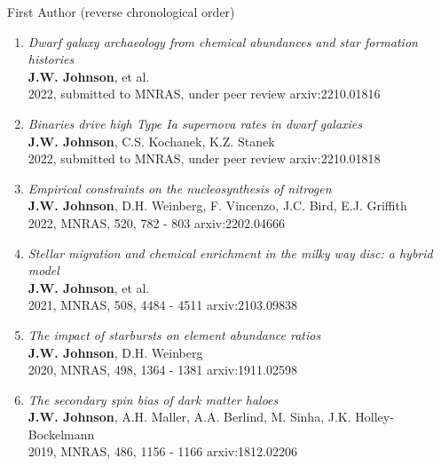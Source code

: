 \documentclass[cv.tex]{subfiles}
\begin{document}
%
\noindent
{\color{themecolor} \large First Author}
(reverse chronological order)
\par\noindent
\begin{enumerate}

	\vspace{-3mm}

	\item \textit{Dwarf galaxy archaeology from chemical abundances and star
	formation histories}
	\\
	\textbf{J.W. Johnson}, et al.
	\\
	2022, submitted to MNRAS, under peer review \hfill arxiv:2210.01816

	\item \textit{Binaries drive high Type Ia supernova rates in dwarf
	galaxies}
	\\
	\textbf{J.W. Johnson}, C.S. Kochanek, K.Z. Stanek
	\\
	2022, submitted to MNRAS, under peer review \hfill arxiv:2210.01818

	\item \textit{Empirical constraints on the nucleosynthesis of nitrogen}
	\\
	\textbf{J.W. Johnson}, D.H. Weinberg, F. Vincenzo, J.C. Bird, E.J. Griffith
	\\
	2022, MNRAS, 520, 782 - 803 \hfill arxiv:2202.04666

	\item \textit{Stellar migration and chemical enrichment in the milky way
	disc: a hybrid model}
	\\
	\textbf{J.W. Johnson}, et al.
	\\
	2021, MNRAS, 508, 4484 - 4511 \hfill arxiv:2103.09838

	\item \textit{The impact of starbursts on element abundance ratios}
	\\
	\textbf{J.W. Johnson}, D.H. Weinberg
	\\
	2020, MNRAS, 498, 1364 - 1381 \hfill arxiv:1911.02598

	\item \textit{The secondary spin bias of dark matter haloes}
	\\
	\textbf{J.W. Johnson}, A.H. Maller, A.A. Berlind, M. Sinha,
	J.K. Holley-Bockelmann
	\\
	2019, MNRAS, 486, 1156 - 1166 \hfill arxiv:1812.02206

\end{enumerate}
\end{document}
